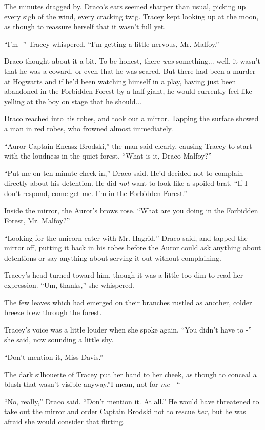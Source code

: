 The minutes dragged by. Draco's ears seemed sharper than usual, picking
up every sigh of the wind, every cracking twig. Tracey kept looking up
at the moon, as though to reassure herself that it wasn't full yet.

``I'm -'' Tracey whispered. ``I'm getting a little nervous, Mr.
Malfoy.''

Draco thought about it a bit. To be honest, there \emph{was}
something... well, it wasn't that he was a coward, or even that he
was scared. But there had been a murder at Hogwarts and if he'd been
watching himself in a play, having just been abandoned in the Forbidden
Forest by a half-giant, he would currently feel like yelling at the boy
on stage that he should...

Draco reached into his robes, and took out a mirror. Tapping the surface
showed a man in red robes, who frowned almost immediately.

``Auror Captain Eneasz Brodski,'' the man said clearly, causing Tracey
to start with the loudness in the quiet forest. ``What is it, Draco
Malfoy?''

``Put me on ten-minute check-in,'' Draco said. He'd decided not to
complain directly about his detention. He did \emph{not} want to look
like a spoiled brat. ``If I don't respond, come get me. I'm in the
Forbidden Forest.''

Inside the mirror, the Auror's brows rose. ``What are you doing in the
Forbidden Forest, Mr. Malfoy?''

``Looking for the unicorn-eater with Mr. Hagrid,'' Draco said, and
tapped the mirror off, putting it back in his robes before the Auror
could ask anything about detentions or say anything about serving it out
without complaining.

Tracey's head turned toward him, though it was a little too dim to read
her expression. ``Um, thanks,'' she whispered.

The few leaves which had emerged on their branches rustled as another,
colder breeze blew through the forest.

Tracey's voice was a little louder when she spoke again. ``You didn't
have to -'' she said, now sounding a little shy.

``Don't mention it, Miss Davis.''

The dark silhouette of Tracey put her hand to her cheek, as though to
conceal a blush that wasn't visible anyway.''I mean, not for \emph{me} -
``

``No, really,'' Draco said. ``Don't mention it. At all.'' He would have
threatened to take out the mirror and order Captain Brodski not to
rescue \emph{her,} but he was afraid she would consider that flirting.

